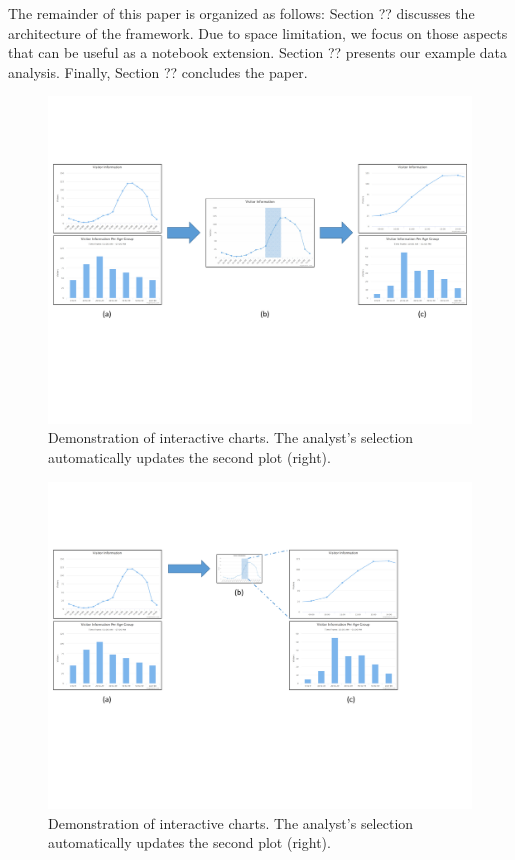 The remainder of this paper is organized as follows: Section ?? discusses the architecture of the {\projname} framework. Due to space limitation, we focus on those aspects that can be useful as a notebook extension. Section ?? presents our example data analysis. Finally, Section ?? concludes the paper.

\begin{figure}
	\includegraphics[width=\textwidth]{figures/highchart_final_a.pdf}
	\caption{Demonstration of interactive charts. The analyst's selection automatically updates the second plot (right).}
	\label{fig:vision}
\end{figure}

\begin{figure}
	\includegraphics[width=\textwidth]{figures/highchart_final_b.pdf}
	\caption{Demonstration of interactive charts. The analyst's selection automatically updates the second plot (right).}
	\label{fig:vision}
\end{figure}

